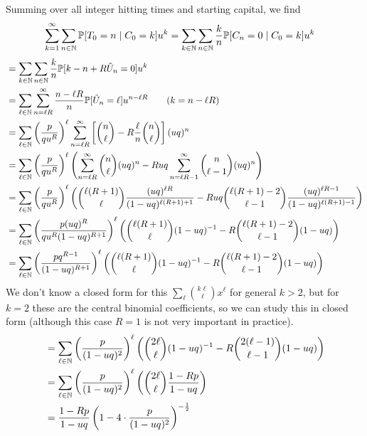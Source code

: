 Summing over all integer hitting times and starting capital, we find
\begin{align*}
  \sum_{k=1}^\infty\sum_{n\in\mathbb{N}} \mathbb{P}[T_0 = n\mid C_0=k]u^k &= \sum_{k\in\mathbb{N}}\sum_{n\in\mathbb{N}} \frac{k}{n} \mathbb{P}[C_n = 0\mid C_0=k]u^k 
\end{align*}
\begin{align*}
  &= \sum_{k\in\mathbb{N}}\sum_{n\in\mathbb{N}} \frac{k}{n} \mathbb{P}[k - n + R\tilde{U}_n = 0]u^k \\
  &= \sum_{\ell\in\mathbb{N}}\sum_{n=\ell R}^\infty \frac{n-\ell R}{n} \mathbb{P}[\tilde{U}_n = \ell]u^{n-\ell R}   \qquad (k=n-\ell R)\\
  &= \sum_{\ell\in\mathbb{N}} \left( \frac{p}{qu^R} \right)^\ell \sum_{n=\ell R}^\infty \left[ 
    {n\choose \ell} - R \frac{\ell}{n} {n\choose \ell} 
  \right](uq)^n \\
  &= \sum_{\ell\in\mathbb{N}} \left( \frac{p}{qu^R} \right)^\ell 
  \left( 
    \sum_{n=\ell R}^\infty {n\choose \ell} (uq)^n - 
    Ruq \sum_{n=\ell R - 1}^\infty {n\choose \ell-1} (uq)^n
  \right) \\
  &= \sum_{\ell\in\mathbb{N}} \left( 
    \frac{p}{qu^R} 
  \right)^\ell 
  \left(
    {\ell(R+1) \choose \ell} \frac{ (uq)^{\ell R} } {(1-uq)^{\ell(R+1)+1} } - 
    Ruq {\ell(R+1)-2 \choose \ell - 1} \frac { (uq)^{\ell R-1} } { (1-uq)^{\ell(R+1) -1} }
  \right) \\
  &= \sum_{\ell\in\mathbb{N}} \left( 
    \frac{p(uq)^R}{qu^R(1-uq)^{R+1}} 
  \right)^\ell 
  \left(
    {\ell(R+1) \choose \ell} (1-uq)^{-1} - 
    R {\ell(R+1)-2 \choose \ell - 1} (1-uq)
  \right)  \\
  &= \sum_{\ell\in\mathbb{N}} \left( 
    \frac{pq^{R-1}}{(1-uq)^{R+1}} 
  \right)^\ell 
  \left(
    {\ell(R+1) \choose \ell} (1-uq)^{-1} - 
    R {\ell(R+1)-2 \choose \ell - 1} (1-uq)
  \right)
\end{align*}
%
We don't know a closed form for this $\sum_\ell { k\ell \choose \ell }x^\ell $ for general $k>2$, but for $k=2$ these are the central binomial coefficients, so we can study this in closed form (although this case $R=1$ is not very important in practice).
%
\begin{align*}
  &= \sum_{\ell\in\mathbb{N}} \left( 
    \frac{p}{(1-uq)^{2}} 
  \right)^\ell 
  \left(
    {2\ell \choose \ell} (1-uq)^{-1} - 
    R {2(\ell-1) \choose \ell - 1} (1-uq)
  \right) \\
  &= \sum_{\ell\in\mathbb{N}} \left( 
    \frac{p}{(1-uq)^{2}} 
  \right)^\ell 
  \left(
    {2\ell \choose \ell} \frac{1-Rp}{1-uq}
  \right) \\
  &= \frac{1-Rp}{1-uq}\left(
    1 - 4\cdot \frac{p}{(1-uq)^{2}}
  \right)^{-\frac{1}{2}} 
\end{align*}

